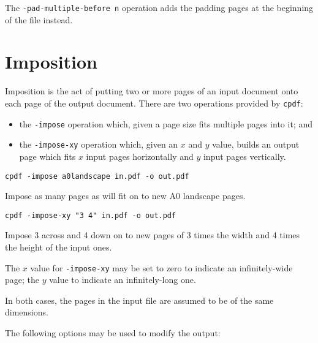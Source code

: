 \documentclass{book}
\begin{document}
\noindent The \texttt{-pad-multiple-before n} operation adds the padding pages at the beginning of the file  instead.

\section{Imposition}


Imposition is the act of putting two or more pages of an input document onto each page of the output document. There are two operations provided by \texttt{cpdf}:

\begin{itemize}
\item the \texttt{-impose} operation which, given a page size fits multiple pages into it; and
\item the \texttt{-impose-xy} operation which, given an $x$ and $y$ value, builds an output page which fits $x$ input pages horizontally and $y$ input pages vertically. \end{itemize}

  \begin{framed}
    \small\verb!cpdf -impose a0landscape in.pdf -o out.pdf!
 
    \vspace{2.5mm}
    \noindent Impose as many pages as will fit on to new A0 landscape pages. 
  \end{framed}

  \begin{framed}
    \small\verb!cpdf -impose-xy "3 4" in.pdf -o out.pdf!
 
    \vspace{2.5mm}
    \noindent Impose 3 across and 4 down on to new pages of 3 times the width and 4 times the height of the input ones. 
  \end{framed}

The $x$ value for \texttt{-impose-xy} may be set to zero to indicate an infinitely-wide page; the $y$ value to indicate an infinitely-long one.

In both cases, the pages in the input file are assumed to be of the same dimensions.

The following options may be used to modify the output:
\end{document}
